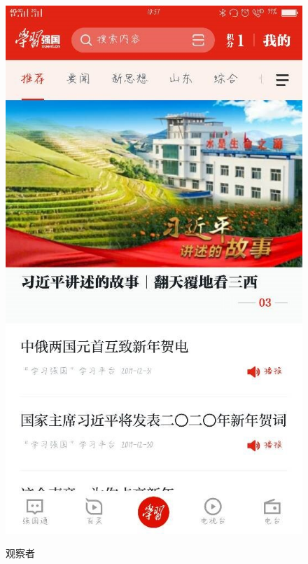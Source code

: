 \documentclass{article}
\begin{document}
\begin{itemize}
\begin{figure}[h!]
    \includegraphics[scale=0.35]{guanchazhe}
    \label{fig:guanchazhe}
    \caption{观察者}
    \end{figure}
    \begin{figure}[h!]
    \centering

\end{figure}
\end{itemize}
\end{document}
